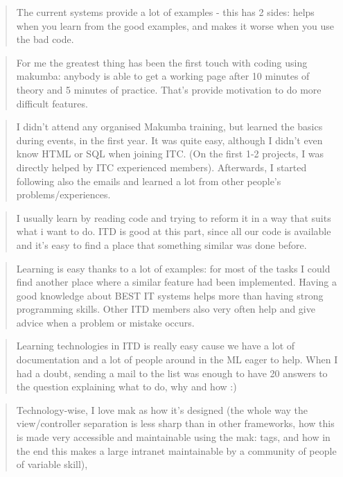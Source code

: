 \documentclass{acm_proc_article-sp}
\begin{document}
\begin{quotation}
	The current systems provide a lot of examples - this has 2 sides: helps when you learn from the good examples, and makes it worse when you use the bad code. 
\end{quotation}

\begin{quotation}
	For me the greatest thing has been the first touch with coding using makumba: anybody is able to get a working page after 10 minutes of theory and 5 minutes of practice. That's provide motivation to do more difficult features.
\end{quotation}

\begin{quotation}
	I didn't attend any organised Makumba training, but learned the basics during events, in the first year. It was quite easy, although I didn't even know HTML or SQL when joining ITC. 
	(On the first 1-2 projects, I was directly helped by ITC experienced members). Afterwards, I started following also the emails and learned a lot from other people's problems/experiences.	
\end{quotation}

\begin{quotation}
	I usually learn by reading code and trying to reform it in a way that suits what i want to do. ITD is good at this part, since all our code is available and it's easy to find a place that something similar was done before. 
\end{quotation}

\begin{quotation}
	Learning is easy thanks to a lot of examples: for most of the tasks I could find another place where a similar feature had been implemented. Having a good knowledge about BEST IT systems helps more than having strong programming skills. Other ITD members also very often help and give advice when a problem or mistake occurs. 
\end{quotation}

\begin{quotation}
	Learning technologies in ITD is really easy cause we have a lot of documentation and a lot of people around in the ML eager to help. When I had a doubt, sending a mail to the list was enough to have 20 answers to the question explaining what to do, why and how :) 
\end{quotation}

\begin{quotation}
	Technology-wise, I love mak as how it's designed (the whole way the view/controller separation is less sharp than in other frameworks, how this is made very accessible and maintainable using the mak: tags, and how in the end this makes a large intranet maintainable by a community of people of variable skill), 
\end{quotation}
\end{document}
